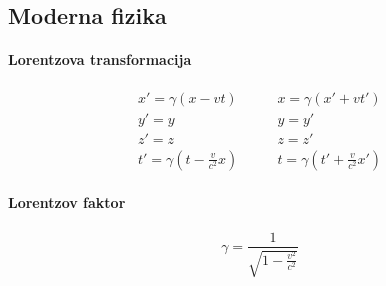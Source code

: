 \documentclass[a4paper,12pt]{article}
\begin{document}
\subsection{Moderna fizika}
\begin{multicols}{2}
    \paragraph{Lorentzova transformacija}
    \begin{align}
        x' = \gamma (x - vt)              & \qquad x = \gamma (x' + vt')              \\
        y' = y                            & \qquad y = y'                             \\
        z' = z                            & \qquad z = z'                             \\
        t' = \gamma (t - \frac{v}{c^2} x) & \qquad t = \gamma (t' + \frac{v}{c^2} x')
    \end{align}

    \paragraph{Lorentzov faktor}
    \begin{equation}
        \gamma = \frac{1}{\sqrt{1 - \frac{v^2}{c^2}}}
    \end{equation}

\end{multicols}
\end{document}
